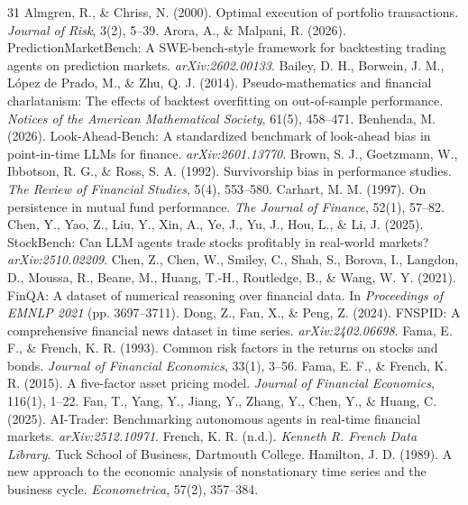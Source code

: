 \documentclass{article}
\begin{document}
\begin{thebibliography}{31}
 Almgren, R., \& Chriss, N. (2000). Optimal execution of portfolio transactions. \textit{Journal of Risk}, 3(2), 5--39.
 Arora, A., \& Malpani, R. (2026). PredictionMarketBench: A SWE-bench-style framework for backtesting trading agents on prediction markets. \textit{arXiv:2602.00133}.
 Bailey, D. H., Borwein, J. M., L\'{o}pez de Prado, M., \& Zhu, Q. J. (2014). Pseudo-mathematics and financial charlatanism: The effects of backtest overfitting on out-of-sample performance. \textit{Notices of the American Mathematical Society}, 61(5), 458--471.
 Benhenda, M. (2026). Look-Ahead-Bench: A standardized benchmark of look-ahead bias in point-in-time LLMs for finance. \textit{arXiv:2601.13770}.
 Brown, S. J., Goetzmann, W., Ibbotson, R. G., \& Ross, S. A. (1992). Survivorship bias in performance studies. \textit{The Review of Financial Studies}, 5(4), 553--580.
 Carhart, M. M. (1997). On persistence in mutual fund performance. \textit{The Journal of Finance}, 52(1), 57--82.
 Chen, Y., Yao, Z., Liu, Y., Xin, A., Ye, J., Yu, J., Hou, L., \& Li, J. (2025). StockBench: Can LLM agents trade stocks profitably in real-world markets? \textit{arXiv:2510.02209}.
 Chen, Z., Chen, W., Smiley, C., Shah, S., Borova, I., Langdon, D., Moussa, R., Beane, M., Huang, T.-H., Routledge, B., \& Wang, W. Y. (2021). FinQA: A dataset of numerical reasoning over financial data. In \textit{Proceedings of EMNLP 2021} (pp. 3697--3711).
 Dong, Z., Fan, X., \& Peng, Z. (2024). FNSPID: A comprehensive financial news dataset in time series. \textit{arXiv:2402.06698}.
 Fama, E. F., \& French, K. R. (1993). Common risk factors in the returns on stocks and bonds. \textit{Journal of Financial Economics}, 33(1), 3--56.
 Fama, E. F., \& French, K. R. (2015). A five-factor asset pricing model. \textit{Journal of Financial Economics}, 116(1), 1--22.
 Fan, T., Yang, Y., Jiang, Y., Zhang, Y., Chen, Y., \& Huang, C. (2025). AI-Trader: Benchmarking autonomous agents in real-time financial markets. \textit{arXiv:2512.10971}.
 French, K. R. (n.d.). \textit{Kenneth R. French Data Library}. Tuck School of Business, Dartmouth College.
 Hamilton, J. D. (1989). A new approach to the economic analysis of nonstationary time series and the business cycle. \textit{Econometrica}, 57(2), 357--384.

\end{thebibliography}
\end{document}
